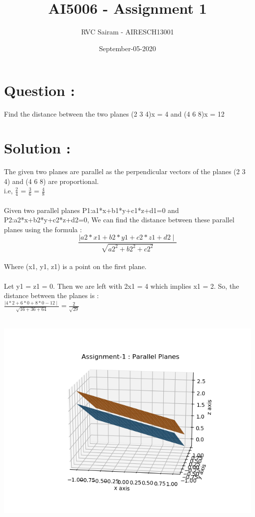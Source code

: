 \documentclass{article}
\title{AI5006 - Assignment 1}
\author{RVC Sairam - AIRESCH13001 }
\date{September-05-2020}
\begin{document}
\maketitle
\section*{Question :}
\large{Find the distance between the two planes
(2 3 4)x = 4 and (4 6 8)x = 12}
\section*{Solution :}
\large{The given two planes are parallel as the perpendicular vectors of the planes (2 3 4) and (4 6 8) are proportional.}\\

\Large{i.e, \( \frac{2}{4} \) = \( \frac{3}{6} \) = \( \frac{4}{8} \)}  \\ \\
\large{Given two parallel planes P1:a1*x+b1*y+c1*z+d1=0 and P2:a2*x+b2*y+c2*z+d2=0, We can find the distance between these parallel planes using the formula : }\\

\[  \frac{\mid a2*x1 + b2*y1 + c2*z1 + d2 \mid}{\sqrt{a2^2 + b2^2 + c2^2}}  \] \\
\large{Where (x1, y1, z1) is a point on the first plane.}\\ \\ 

\large{Let y1 = z1 = 0. Then we are left with 2x1 = 4 which implies x1 = 2. So, the distance between the planes is : \\

\(  \frac{\mid 4*2 + 6*0 + 8*0 - 12 \mid}{\sqrt{16+36+64}}   = \frac{2}{\sqrt{29}}\)}\\ \\

\begin{center}
    \includegraphics[width = .6\textwidth]{parallel planes.png}
\end{center}

     
\end{document}
